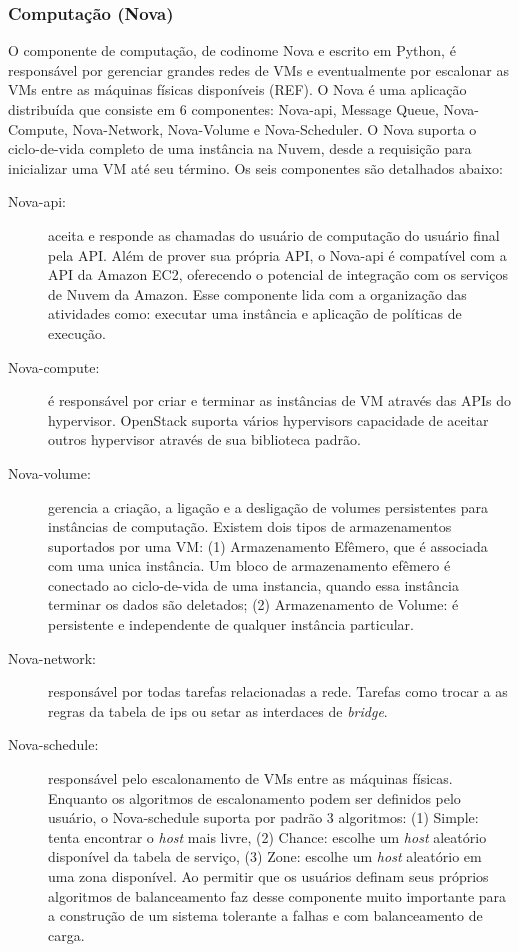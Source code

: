 \subsubsection{Computação (Nova)}

O componente de computação, de codinome Nova e escrito em Python, é responsável por gerenciar grandes redes de VMs e eventualmente por escalonar as VMs entre as máquinas físicas disponíveis (REF). O Nova é uma aplicação distribuída que consiste em 6 componentes: Nova-api, Message Queue, Nova-Compute, Nova-Network, Nova-Volume e Nova-Scheduler. O Nova suporta o ciclo-de-vida completo de uma instância na Nuvem, desde a requisição para inicializar uma VM até seu término. Os seis componentes são detalhados abaixo:

\begin{description}

	\item[Nova-api:] aceita e responde as chamadas do usuário de computação do usuário final pela API. Além de prover sua própria API, o Nova-api é compatível com a API da Amazon EC2, oferecendo o potencial de integração com os serviços de Nuvem da Amazon. Esse componente lida com a organização das atividades como: executar uma instância e aplicação de políticas de execução.

	\item[Nova-compute:] é responsável por criar e terminar as instâncias de VM através das APIs do hypervisor. OpenStack suporta vários hypervisors capacidade de aceitar outros hypervisor através de sua biblioteca padrão.

	\item[Nova-volume:] gerencia a criação, a ligação e a desligação de volumes persistentes para instâncias de computação. Existem dois tipos de armazenamentos suportados por uma VM: (1) Armazenamento Efêmero, que é associada com uma unica instância. Um bloco de armazenamento efêmero é conectado ao ciclo-de-vida de uma instancia, quando essa instância terminar os dados são deletados; (2) Armazenamento de Volume: é persistente e independente de qualquer instância particular. 

	\item[Nova-network:] responsável por todas tarefas relacionadas a rede. Tarefas como trocar a as regras da tabela de ips ou setar as interdaces de \textit{bridge}.

	\item[Nova-schedule:] responsável pelo escalonamento de VMs entre as máquinas físicas. Enquanto os algoritmos de escalonamento podem ser definidos pelo usuário, o Nova-schedule suporta por padrão 3 algoritmos: (1) Simple: tenta encontrar o \textit{host} mais livre, (2) Chance: escolhe um \textit{host} aleatório disponível da tabela de serviço, (3) Zone: escolhe um \textit{host} aleatório em uma zona disponível. Ao permitir que os usuários definam seus próprios algoritmos de balanceamento faz desse componente muito importante para a construção de um sistema tolerante a falhas e com balanceamento de carga.


\end{description}
